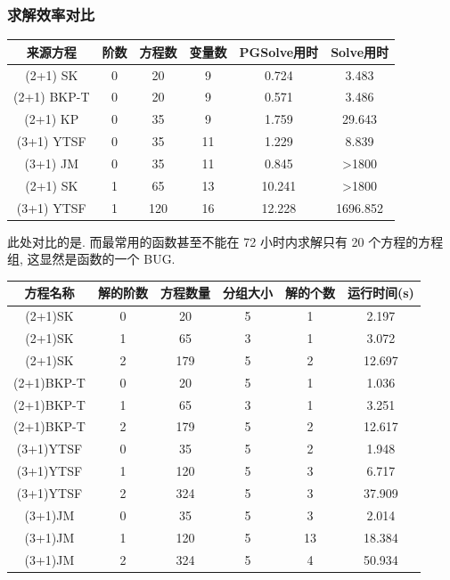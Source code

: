 \begin{frame}
\frametitle{求解效率对比}
\begin{adjustbox}{max width=\textwidth}
\centering
\renewcommand{\arraystretch}{1.3}
\begin{tabular}{cccccc}
\hline
来源方程 & 阶数 & 方程数 & 变量数 & PGSolve用时 & Solve用时 \\
\hline
(2+1) SK & 0 & 20 & 9 & 0.724 & 3.483 \\
(2+1) BKP-T & 0 & 20 & 9 & 0.571 & 3.486 \\
(2+1) KP & 0 & 35 & 9 & 1.759 & 29.643 \\
(3+1) YTSF & 0 & 35 & 11 & 1.229 & 8.839 \\
(3+1) JM & 0 & 35 & 11 & 0.845 & >1800 \\
(2+1) SK & 1 & 65 & 13 & 10.241 & >1800 \\
(3+1) YTSF & 1 & 120 & 16 & 12.228 & 1696.852 \\
\hline
\end{tabular}
\end{adjustbox}

\vspace{1em}

此处对比的是. 而最常用的函数甚至不能在 72 小时内求解只有 20 个方程的方程组, 这显然是函数的一个 BUG.

\end{frame}

\begin{frame}

\begin{adjustbox}{max width=\textwidth}
\renewcommand{\arraystretch}{1.3}
\begin{tabular}{cccccc}
\hline
方程名称    & 解的阶数 & 方程数量 & 分组大小 & 解的个数 & 运行时间(s) \\ 
\hline 
(2+1)SK & 0 & 20 & 5 & 1 & 2.197 \\
(2+1)SK & 1 & 65 & 3 & 1 & 3.072 \\
(2+1)SK & 2 & 179 & 5 & 2 & 12.697 \\
(2+1)BKP-T & 0 & 20 & 5 & 1 & 1.036 \\
(2+1)BKP-T & 1 & 65 & 3 & 1 & 3.251 \\
(2+1)BKP-T & 2 & 179 & 5 & 2 & 12.617 \\
(3+1)YTSF & 0 & 35 & 5 & 2 & 1.948 \\
(3+1)YTSF & 1 & 120 & 5 & 3 & 6.717 \\
(3+1)YTSF & 2 & 324 & 5 & 3 & 37.909 \\
(3+1)JM & 0 & 35 & 5 & 3 & 2.014 \\
(3+1)JM & 1 & 120 & 5 & 13 & 18.384 \\
(3+1)JM & 2 & 324 & 5 & 4 & 50.934 \\
\hline 
\end{tabular}
\end{adjustbox}
\end{frame}

